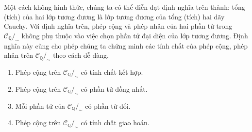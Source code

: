 Một cách không hình thức, chúng ta có thể diễn đạt định nghĩa trên thành: tổng (tích) của hai lớp tương đương là lớp tương đương của tổng (tích) hai dãy Cauchy. Với định nghĩa trên, phép cộng và phép nhân của hai phần tử trong $\mathscr{C}_{\mathbb{Q}}/_{\sim}$ không phụ thuộc vào việc chọn phần tử đại diện của lớp tương đương. Định nghĩa này cũng cho phép chúng ta chứng minh các tính chất của phép cộng, phép nhân trên $\mathscr{C}_{\mathbb{Q}}/_{\sim}$ theo cách dễ dàng.

\begin{theorem}
    \begin{enumerate}[label={(\roman*)}]
        \item Phép cộng trên $\mathscr{C}_{\mathbb{Q}}/_{\sim}$ có tính chất kết hợp.
        \item Phép cộng trên $\mathscr{C}_{\mathbb{Q}}/_{\sim}$ có phần tử đồng nhất.
        \item Mỗi phần tử của $\mathscr{C}_{\mathbb{Q}}/_{\sim}$ có phần tử đối.
        \item Phép cộng trên $\mathscr{C}_{\mathbb{Q}}/_{\sim}$ có tính chất giao hoán.
    \end{enumerate}
\end{theorem}

